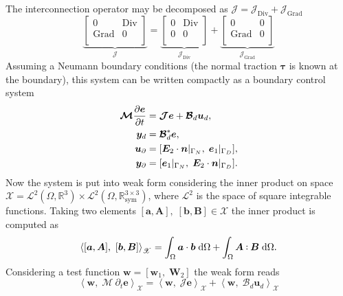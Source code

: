 \documentclass{svjour3}                     %
\DeclareMathOperator*{\Grad}{Grad}
\DeclareMathOperator*{\Div}{Div}
\def\onedot{$\mathsurround0pt\ldotp$}
\def\cddot{%
	\mathbin{\vcenter{\baselineskip.67ex
			\hbox{\onedot}\hbox{\onedot}}%
}}
\begin{document}
The interconnection operator may be decomposed as $\bm{\mathcal{J}} = \bm{\mathcal{J}}_{\Div} + \bm{\mathcal{J}}_{\Grad}$
\begin{equation}
\underbrace{\begin{bmatrix}
	0 & \Div \\ \Grad & 0 \\
	\end{bmatrix}}_{\bm{\mathcal{J}}} = 
\underbrace{\begin{bmatrix}
	0 & \Div \\ 0  & 0 \\
	\end{bmatrix}}_{\bm{\mathcal{J}}_{\Div}} + 
\underbrace{\begin{bmatrix}
	0 & 0 \\ \Grad & 0 \\
	\end{bmatrix}}_{\bm{\mathcal{J}}_{\Grad}}
\end{equation}
Assuming a Neumann boundary conditions (the normal traction $\bm\tau$ is known at the boundary),
this system can be written compactly as a boundary control system
\begin{equation}
\label{eq:eldyn_PDE}
\begin{aligned}
\bm{\mathcal{M}} \diffp{\bm{e}}{t} &= \bm{\mathcal{J}} \bm{e} + \bm{\mathcal{B}}_d \bm{u}_d, \\
\bm{y}_d &= \bm{\mathcal{B}}_d^* \bm{e}, \\
\bm{u}_\partial &= [\bm{E}_2 \cdot \bm{n}|_{\Gamma_N}, \; \bm{e}_1|_{\Gamma_D}], \\
\bm{y}_\partial &= [\bm{e}_1|_{\Gamma_N}, \; \bm{E}_2 \cdot \bm{n}|_{\Gamma_D}].
\end{aligned}
\end{equation}
Now the system is put into weak form considering the inner product on space $\mathscr{X} = \mathscr{L}^2(\Omega, \mathbb{R}^3) \times \mathscr{L}^2(\Omega, \mathbb{R}^{3\times 3}_{\text{sym}})$, where $\mathscr{L}^2$ is the space of square integrable functions. Taking two elements $[\bm{a}, \bm{A}], \; [\bm{b}, \bm{B}] \in \mathscr{X}$ the inner product is computed as
\[
\left\langle [\bm{a}, \bm{A}], \ [\bm{b}, \bm{B}] \right\rangle_{\mathscr{X}} = \int_{\Omega} \bm{a} \cdot \bm{b} \d{\Omega} + \int_{\Omega} \bm{A} \cddot \bm{B} \d{\Omega}.
\]
Considering a test function $\bm{w} = [\bm{w}_1, \; \bm{W}_2]$ the weak form reads
\begin{equation*}
\left\langle \bm{w}, \; \bm{\mathcal{M}} \ \partial_t \bm{e} \right\rangle_{\mathscr{X}} = \left\langle \bm{w}, \; \bm{\mathcal{J}} \bm{e} \right\rangle_{\mathscr{X}} + \left\langle \bm{w}, \; \bm{\mathcal{B}}_d \bm{u}_d \right\rangle_{\mathscr{X}}
\end{equation*}
\end{document}
